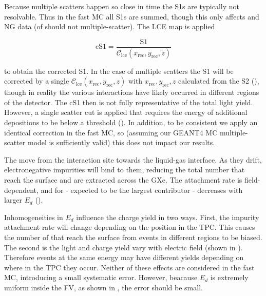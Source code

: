 Because multiple scatters happen so close in time the S1s are typically not resolvable.  Thus in the fast MC all S1s are summed, though
this only affects \ambe and NG data (\betadecay of  should not multiple-scatter).  The LCE map is applied

\vspace{-10pt}

\begin{equation}
\mathrm{cS1} = \frac{\mathrm{S1}}{\mathcal{C}_{\mathrm{lce}}(x_{\mathrm{rec}}, y_{\mathrm{rec}}, z)}
\label{eq:er_nr_calibrations_parameter_determ_det_phys_cs1}
\end{equation}

\noindent to obtain the corrected S1.  In the case of multiple scatters the S1 will be corrected by a single
$\mathcal{C}_{\mathrm{lce}}(x_{\mathrm{rec}}, y_{\mathrm{rec}}, z)$ with $x_{\mathrm{rec}}, y_{\mathrm{rec}}, z$ calculated from the S2
(), though in reality the various interactions have
likely occurred in different regions of the detector.  The cS1 then is not fully representative of the total light yield.  However,
a single scatter cut is applied that requires the energy of additional depositions to be below a threshold
().  In addition, to be
consistent we apply an identical correction in the fast MC, so (assuming our GEANT4 MC multiple-scatter model is sufficiently
valid) this does not impact our results.

The \electron move from the interaction site towards the liquid-gas interface.  As they drift, electronegative
impurities will bind to them, reducing the total number that reach the surface and are extracted across the GXe.  The attachment rate
is field-dependent, and for  - expected to be the largest contributor - decreases with larger $E_d$
().

Inhomogeneities in $E_d$ influence the charge yield in two ways.  First, the impurity attachment rate will change depending on the
position in the TPC.   This causes the number of \electron that reach the surface from events in different regions to be
biased.  The second is the light and charge yield vary with electric field (shown in
).  Therefore events at the same energy may have
different yields depending on where in the TPC they occur.  Neither of these effects are considered
in the fast MC, introducing a small systematic error.  However, beacause $E_d$ is extremely uniform inside the FV, as shown in
, the error should be small.

